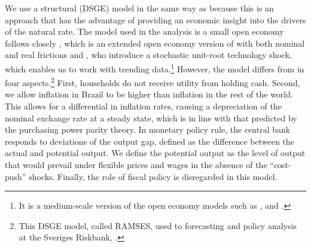 \documentclass[12pt,oneside,a4paper]{article}
\begin{document}
We use a structural (DSGE) model in the same way as \citet{Neiss:2003} because this is an approach that has the advantage of providing an economic insight into the drivers of the natural rate. The model used in the analysis is a small open economy follows closely \citet{Adolfson:2007}, which is an extended open economy version of \citet{Christiano:2005} with both nominal and real frictions and \citet{Altig:2011}, who introduce a stochastic unit-root technology shock, which enables us to work with trending data.\footnote{It is a medium-scale version of the open economy models such as \citet{Gali:2005}, \citet{Monacelli:2005} and \citet{Lubik:2007}.} However, the model differs from \citet{Adolfson:2007} in four aspects.\footnote{This DSGE model, called RAMSES, used to forecasting and policy analysis at the Sveriges Riskbank, \citet{Adolfson:2008}.} First, households do not receive utility from holding cash. Second, we allow inflation in Brazil to be higher than inflation in the rest of the world. This allows for a differential in inflation rates, causing a depreciation of the nominal exchange rate at a steady state, which is in line with that predicted by the purchasing power parity theory. In monetary policy rule, the central bank responds to deviations of the output gap, defined as the difference between the actual and potential output. We define the potential output as the level of output that would prevail under flexible prices and wages in the absence of the “cost-push” shocks. Finally, the role of fiscal policy is disregarded in this model.


\end{document}
